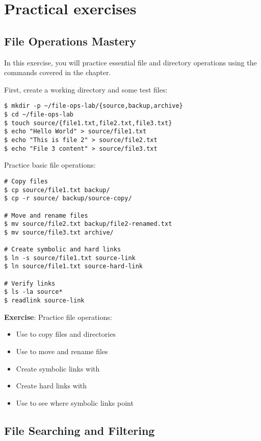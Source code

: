 \newpage

\section{Practical exercises}

\subsection{File Operations Mastery}

In this exercise, you will practice essential file and directory operations using the commands covered in the chapter.

First, create a working directory and some test files:

\begin{lstlisting}[style=bashstyle]
$ mkdir -p ~/file-ops-lab/{source,backup,archive}
$ cd ~/file-ops-lab
$ touch source/{file1.txt,file2.txt,file3.txt}
$ echo "Hello World" > source/file1.txt
$ echo "This is file 2" > source/file2.txt
$ echo "File 3 content" > source/file3.txt
\end{lstlisting}

Practice basic file operations:

\begin{lstlisting}[style=bashstyle]
# Copy files
$ cp source/file1.txt backup/
$ cp -r source/ backup/source-copy/

# Move and rename files
$ mv source/file2.txt backup/file2-renamed.txt
$ mv source/file3.txt archive/

# Create symbolic and hard links
$ ln -s source/file1.txt source-link
$ ln source/file1.txt source-hard-link

# Verify links
$ ls -la source*
$ readlink source-link
\end{lstlisting}

\textbf{Exercise}: Practice file operations:
\begin{itemize}
    \item Use  to copy files and directories
    \item Use  to move and rename files
    \item Create symbolic links with 
    \item Create hard links with 
    \item Use  to see where symbolic links point
\end{itemize}

\subsection{File Searching and Filtering}

